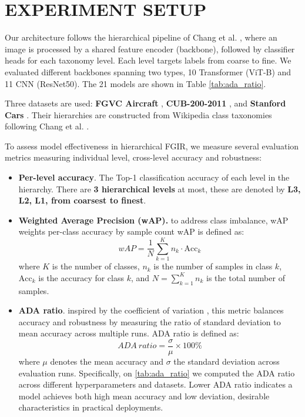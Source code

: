 \documentclass[sigconf, screen, review, anonymous]{acmart}
\begin{document}
\section{EXPERIMENT SETUP}
Our architecture follows the hierarchical pipeline of Chang et al. \cite{chang_your_2021}, where an image is processed by a shared feature encoder (backbone), followed by classifier heads for each taxonomy level. Each level targets labels from coarse to fine. We evaluated different backbones spanning two types, 10 Transformer (ViT-B) and 11 CNN (ResNet50). The 21 models are shown in Table \ref{tab:ada_ratio}.

Three datasets are used: \textbf{FGVC Aircraft} \cite{maji_fine-grained_2013}, \textbf{CUB-200-2011} \cite{wah_caltech-ucsd_2011}, and \textbf{Stanford Cars} \cite{krause_collecting_nodate}. Their hierarchies are constructed from Wikipedia class taxonomies following Chang et al. \cite{chang_your_2021}.

To assess model effectiveness in hierarchical FGIR, we measure several evaluation metrics measuring individual level, cross-level accuracy and robustness:
\begin{itemize}
    \item \textbf{Per-level accuracy}. The Top-1 classification accuracy of each level in the hierarchy. There are \textbf{3 hierarchical levels} at most, these are denoted by \textbf{L3, L2, L1, from coarsest to finest}.

    \item \textbf{Weighted Average Precision (wAP).}  
    to address class imbalance, wAP weights per-class accuracy by sample count
    wAP is defined as:
    \[
    wAP = \frac{1}{N} \sum_{k=1}^{K} n_k \cdot \text{Acc}_k
    \]
    where $K$ is the number of classes, $n_k$ is the number of samples in class $k$, $\text{Acc}_k$ is the accuracy for class $k$, and $N = \sum_{k=1}^{K} n_k$ is the total number of samples.
    
    \item \textbf{ADA ratio}. 
    inspired by the coefficient of variation \cite{brown_applied_1998}, this metric balances accuracy and robustness by measuring the ratio of standard deviation to mean accuracy across multiple runs.
    ADA ratio is defined as:
    \[
    ADA\ ratio = \frac{\sigma}{\mu} \times 100\% 
    \]
    where $\mu$ denotes the mean accuracy and $\sigma$ the standard deviation across evaluation runs. Specifically, on \cref{tab:ada_ratio} we computed the ADA ratio across different hyperparameters and datasets. Lower ADA ratio indicates a model achieves both high mean accuracy and low deviation, desirable characteristics in practical deployments. 
\end{itemize}
\end{document}
